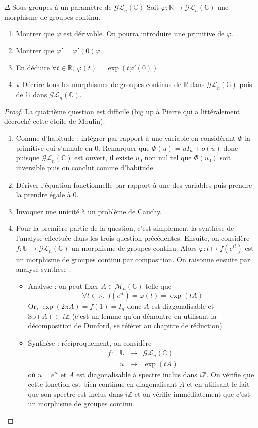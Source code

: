 \documentclass[french,a4paper]{article}
\newcommand{\Z}{\mathbb{Z}}
\newcommand{\R}{\mathbb{R}}
\newcommand{\C}{\mathbb{C}}
\newcommand{\U}{\mathbb{U}}
\theoremstyle{plain}
\theoremstyle{definition}
\theoremstyle{remark}
\begin{document}
\begin{ex}[Moulin.28]{$\Delta$ Sous-groupes à un paramètre de $\mathcal{GL}_n(\C)$}
	Soit $\varphi:\R\to\mathcal{GL}_n(\C)$ une morphisme de groupes continu.
	\begin{enumerate}
		\item Montrer que $\varphi$ est dérivable. On pourra introduire une primitive de $\varphi$.
		\item Montrer que $\varphi'=\varphi'(0)\varphi$.
		\item En déduire $\forall t\in\R,\ \varphi(t)=\exp(t\varphi'(0))$.
		\item $\star$ Décrire tous les morphismes de groupes continus de $\R$ dans $\mathcal{GL}_n(\C)$ puis de $\U$ dans $\mathcal{GL}_n(\C)$.
	\end{enumerate}
\end{ex}
\begin{proof}
	La quatrième question est difficile (big up à Pierre qui a littéralement décroché cette étoile de Moulin).
	\begin{enumerate}
		\item Comme d'habitude : intégrer par rapport à une variable en considérant $\Phi$ la primitive qui s'annule en $0$. Remarquer que $\Phi(u)=uI_n+o(u)$ donc puisque $\mathcal{GL}_n(\C)$ est ouvert, il existe $u_0$ non nul tel que $\Phi(u_0)$ soit inversible puis on conclut comme d'habitude.
		\item Dériver l'équation fonctionnelle par rapport à une des variables puis prendre la prendre égale à $0$.
		\item Invoquer une unicité à un problème de Cauchy.
		\item Pour la première partie de la question, c'est simplement la synthèse de l'analyse effectuée dans les trois question précédentes. Ensuite, on considère $f:\U\to\mathcal{GL}_n(\C)$ un morphisme de groupes continu. Alors $\varphi:t\mapsto f(e^{it})$ est un morphisme de groupes continu par composition. On raisonne ensuite par analyse-synthèse :
		\begin{itemize}
			\item Analyse : on peut fixer $A\in\mathcal{M}_n(\C)$ telle que $$\forall t\in\R,\ f(e^{it})=\varphi(t)=\exp(tA)$$ Or, $\exp(2\pi A)=f(1)=I_n$ donc $A$ est diagonalisable et $\text{Sp}(A)\subset i\Z$ (c'est un lemme qu'on démontre en utilisant la décomposition de Dunford, se référer au chapitre de réduction).
			\item Synthèse : réciproquement, on considère $$\begin{array}{lrcl}
				f:&\U&\longrightarrow&\mathcal{GL}_n(\C)\\
				&u&\longmapsto&\exp(tA)
			\end{array}$$ où $u=e^{it}$ et $A$ est diagonalisable à spectre inclus dans $i\Z$. On vérifie que cette fonction est bien continue en diagonalisant $A$ et en utilisant le fait que son spectre est inclus dans $i\Z$ et on vérifie immédiatement que c'est un morphisme de groupes continu.
		\end{itemize}
	\end{enumerate}
\end{proof}
\end{document}
